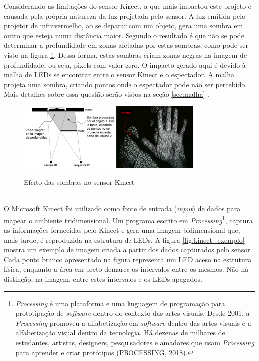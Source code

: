 Considerando as limitações do sensor Kinect, a que mais impactou este projeto é causada pela própria natureza da luz projetada pelo sensor. A luz emitida pelo projetor de infravermelho, ao se deparar com um objeto, gera uma sombra em outro que esteja numa distância maior. Segundo  o resultado é que não se pode determinar a profundidade em zonas afetadas por estas sombras, como pode ser visto na figura \ref{fig:kinect_sombras}. Dessa forma, estas sombras criam zonas negras na imagem de profundidade, ou seja, pixels com valor zero. O impacto gerado aqui é devido à malha de LEDs se encontrar entre o sensor Kinect e o espectador. A malha projeta uma sombra, criando pontos onde o espectador pode não ser percebido.  Mais detalhes sobre essa questão serão vistos na seção \ref{sec:malha} .

\begin{figure}[H]
    \centering
    \caption{Efeito das sombras no sensor Kinect}
	\vspace*{0,2cm}
    \includegraphics[width=0.8\textwidth]{./04-figuras/kinect_sombras}
    \label{fig:kinect_sombras}
\end{figure}
\vspace*{-0,9cm}
{\raggedright {}}\\


O Microsoft Kinect foi utilizado como fonte de entrada (\textit{input}) de dados para mapear o ambiente tridimensional. Um programa escrito em \textit{Processing}\footnote{\textit{Processing} é uma plataforma e uma linguagem de programação para prototipação de \textit{software} dentro do contexto das artes visuais. Desde 2001, a \textit{Processing} promoveu a alfabetização em \textit{software} dentro das artes visuais e a alfabetização visual dentro da tecnologia. Há dezenas de milhares de estudantes, artistas, designers, pesquisadores e amadores que usam \textit{Processing} para aprender e criar protótipos (PROCESSING, 2018).}, captura as informações fornecidas pelo Kinect e gera uma imagem bidimensional que, mais tarde, é reproduzida na estrutura de LEDs. A figura \ref{fig:kinect_exemplo} mostra um exemplo de imagem criada a partir dos dados capturados pelo sensor. Cada ponto branco apresentado na figura representa um LED aceso na estrutura física, enquanto a área em preto demarca os intervalos entre os mesmos. Não há distinção, na imagem, entre estes intervalos e os LEDs apagados. 


